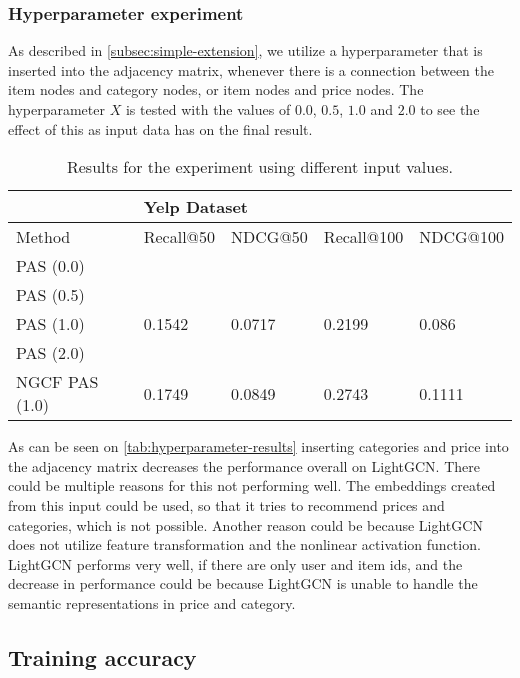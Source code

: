\subsubsection{Hyperparameter experiment}
As described in \autoref{subsec:simple-extension}, we utilize a hyperparameter that is inserted into the adjacency matrix, whenever there is a connection between the item nodes and category nodes, or item nodes and price nodes.
The hyperparameter $X$ is tested with the values of $0.0$, $0.5$, $1.0$ and $2.0$ to see the effect of this as input data has on the final result.
\begin{table*}[h!]
    \centering
    \begin{tabular}{|l|l|l|l|l|}
        \hline
        \rowcolor[HTML]{FFFFFF}
                       & \multicolumn{4}{l|}{\cellcolor[HTML]{FFFFFF}Yelp Dataset}                                   \\ \hline
        Method         & Recall@50                                                 & NDCG@50 & Recall@100 & NDCG@100 \\ \hline
        PAS (0.0)      &                                                           &         &            &          \\ \hline
        PAS (0.5)      &                                                           &         &            &          \\ \hline
        PAS (1.0)      & 0.1542                                                    & 0.0717  & 0.2199     & 0.086    \\ \hline
        PAS (2.0)      &                                                           &         &            &          \\ \hline
        NGCF PAS (1.0) & 0.1749                                                    & 0.0849  & 0.2743     & 0.1111   \\ \hline
    \end{tabular}
    \caption{Results for the experiment using different input values.}
    \label{tab:hyperparameter-results}
\end{table*}
As can be seen on \autoref{tab:hyperparameter-results} inserting categories and price into the adjacency matrix decreases the performance overall on LightGCN.
There could be multiple reasons for this not performing well.
The embeddings created from this input could be used, so that it tries to recommend prices and categories, which is not possible.
Another reason could be because LightGCN does not utilize feature transformation and the nonlinear activation function.
LightGCN performs very well, if there are only user and item ids, and the decrease in performance could be because LightGCN is unable to handle the semantic representations in price and category.

\subsection{Training accuracy}